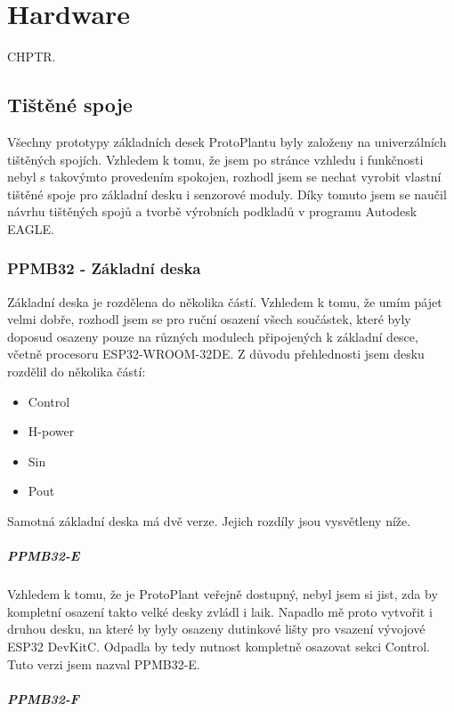 \chapter{Hardware}
CHPTR.

\section{Tištěné spoje}
Všechny prototypy základních desek ProtoPlantu byly založeny na univerzálních tištěných spojích. Vzhledem k tomu, že jsem po stránce vzhledu i funkčnosti nebyl s takovýmto provedením spokojen, rozhodl jsem se nechat vyrobit vlastní tištěné spoje pro základní desku i senzorové moduly.
Díky tomuto jsem se naučil návrhu tištěných spojů a tvorbě výrobních podkladů v programu Autodesk EAGLE.

\subsection{PPMB32 - Základní deska}
Základní deska je rozdělena do několika částí. 
Vzhledem k tomu, že umím pájet velmi dobře, rozhodl jsem se pro ruční osazení všech součástek, které byly doposud osazeny pouze na různých modulech připojených k základní desce, včetně procesoru ESP32-WROOM-32DE.
Z důvodu přehlednosti jsem desku rozdělil do několika částí:

\begin{itemize}
    \item Control 
    \item H-power 
    \item Sin 
    \item Pout 
\end{itemize} 


Samotná základní deska má dvě verze. Jejich rozdíly jsou vysvětleny níže.

\paragraph{PPMB32-E}
Vzhledem k tomu, že je ProtoPlant veřejně dostupný, nebyl jsem si jist, zda by kompletní osazení takto velké desky zvládl i laik. 
Napadlo mě proto vytvořit i druhou desku, na které by byly osazeny dutinkové lišty pro vsazení vývojové ESP32 DevKitC. 
Odpadla by tedy nutnost kompletně osazovat sekci Control. Tuto verzi jsem nazval PPMB32-E.

\paragraph{PPMB32-F}

